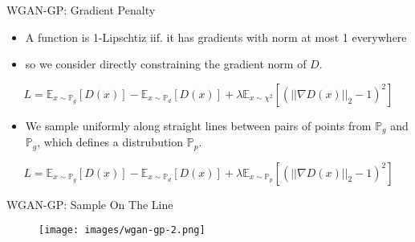 \documentclass[handout]{beamer}
\begin{document}
\begin{frame}[<+->]{WGAN-GP: Gradient Penalty}
	\begin{itemize}
		\item A function is 1-Lipschtiz iif. it has gradients with norm at most 1 everywhere
		\item so we consider directly constraining the gradient norm of $D$.
	\end{itemize}
	\begin{actionenv}
		$$L = \mathbb{E}_{x \sim \mathbb{P}_g}[D(x)] - \mathbb{E}_{x \sim \mathbb{P}_d}[D(x)] + \lambda \mathbb{E}_{x \sim \chi^2}[(||\nabla D(x)||_2 - 1)^2]$$
	\end{actionenv}
	\begin{itemize}
		\item We sample uniformly along straight lines between pairs of points from $\mathbb{P}_g$ and $\mathbb{P}_g$, which defines a distrubution $\mathbb{P}_{p}$.
	\end{itemize}
	\begin{actionenv}
		$$L = \mathbb{E}_{x \sim \mathbb{P}_g}[D(x)] - \mathbb{E}_{x \sim \mathbb{P}_d}[D(x)] + \lambda \mathbb{E}_{x \sim \mathbb{P}_{p}}[(||\nabla D(x)||_2 - 1)^2]$$
	\end{actionenv}
\end{frame}

\begin{frame}{WGAN-GP: Sample On The Line}
	\begin{figure}
		\centering
		\texttt{[image: images/wgan-gp-2.png]}
	\end{figure}
\end{frame}


\end{document}
